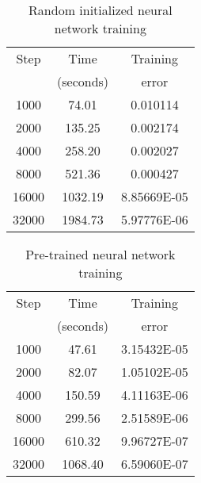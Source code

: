 \documentclass[11pt,reqno]{article}
\numberwithin{equation}{section}
\begin{document}
{\begin{minipage}{0.4\textwidth}
\begin{table}[H]\small
\begin{tabular}{|c|c|c|}
\hline
Step                 & Time        & Training       \\ 
             &(seconds)        & error       \\ \hline
1000                 & 74.01                & 0.010114             \\ \hline
2000                 & 135.25               & 0.002174             \\ \hline
4000                 & 258.20               & 0.002027             \\ \hline
8000                 & 521.36               & 0.000427             \\ \hline
16000                & 1032.19              & 8.85669E-05          \\ \hline
32000                & 1984.73              & 5.97776E-06          \\ \hline
\end{tabular}
\caption{Random initialized neural network training}
\label{table:1}
\end{table}
\end{minipage}\hspace{10mm}
\begin{minipage}{0.4\textwidth}
\begin{table}[H]\small
\begin{tabular}{|c|c|c|}
\hline
Step  & Time & Training \\
     & (seconds) & error \\ \hline
1000  & 47.61         & 3.15432E-05    \\ \hline
2000  & 82.07         & 1.05102E-05    \\ \hline
4000  & 150.59        & 4.11163E-06    \\ \hline
8000  & 299.56        & 2.51589E-06    \\ \hline
16000 & 610.32        & 9.96727E-07    \\ \hline
32000 & 1068.40       & 6.59060E-07    \\ \hline
\end{tabular}
\caption{Pre-trained neural network training}
\label{table:2}
\end{table}
\end{minipage}

}
\end{document}
